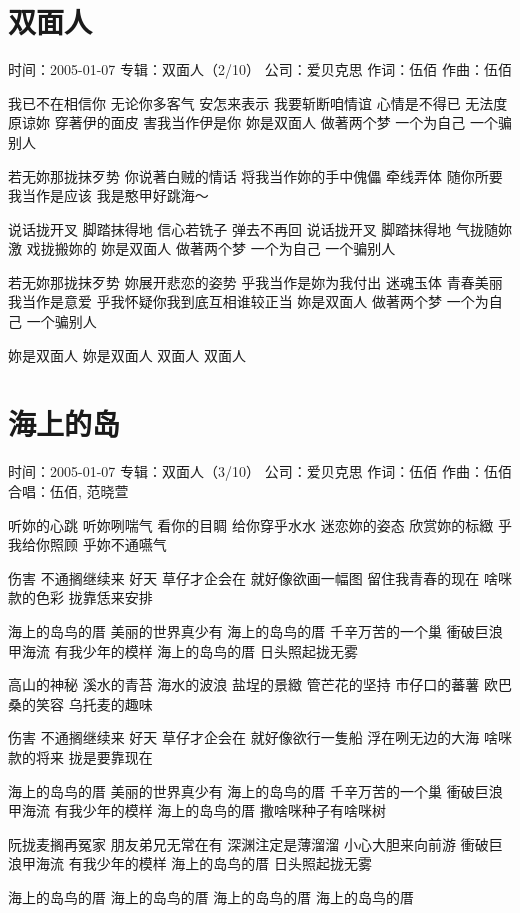 \documentclass[UTF8,a4paper,oneside,twocolumn,12pt]{ctexbook}
\newcommand{\infopair}[2]{\textbullet #1：#2}
\newcommand{\zc}[1][伍佰]{\infopair{作词}{#1}}
\newcommand{\zq}[1][伍佰]{\infopair{作曲}{#1}}
\newcommand{\zj}[1]{\infopair{专辑}{#1}}
\newcommand{\sj}[1]{\infopair{时间}{#1}}
\newcommand{\gs}[1]{\infopair{公司}{#1}}
\newenvironment{info}{\begin{flushleft}\kaishu
	}
	{\end{flushleft}\normalsize\yahei\par}
\newenvironment{lyric}{
	}
{}
\begin{document}
\section{双面人}
\begin{info}
	\sj{2005-01-07}
	\zj{双面人（2/10）}
	\gs{爱贝克思}
	\zc
	\zq
\end{info}
\begin{lyric}
	我已不在相信你 无论你多客气
	安怎来表示 我要斩断咱情谊
	心情是不得已 无法度原谅妳
	穿著伊的面皮 害我当作伊是你
	妳是双面人 做著两个梦
	一个为自己 一个骗别人

	若无妳那拢抹歹势 你说著白贼的情话
	将我当作妳的手中傀儡
	牵线弄体 随你所要 我当作是应该
	我是憨甲好跳海～

	说话拢开叉 脚踏抹得地
	信心若铣子 弹去不再回
	说话拢开叉 脚踏抹得地
	气拢随妳激 戏拢搬妳的
	妳是双面人 做著两个梦
	一个为自己 一个骗别人

	若无妳那拢抹歹势 妳展开悲恋的姿势
	乎我当作是妳为我付出
	迷魂玉体 青春美丽 我当作是意爱
	乎我怀疑你我到底互相谁较正当
	妳是双面人 做著两个梦
	一个为自己 一个骗别人

	妳是双面人 妳是双面人 双面人 双面人
\end{lyric}

\section{海上的岛}
\begin{info}
	\sj{2005-01-07}
	\zj{双面人（3/10）}
	\gs{爱贝克思}
	\zc
	\zq
	\infopair{合唱}{伍佰, 范晓萱}
\end{info}
\begin{lyric}
	听妳的心跳 听妳咧喘气
	看你的目睭 给你穿乎水水
	迷恋妳的姿态 欣赏妳的标緻
	乎我给你照顾 乎妳不通嚥气

	伤害 不通搁继续来
	好天 草仔才企会在
	就好像欲画一幅图 留住我青春的现在
	啥咪款的色彩 拢靠恁来安排

	海上的岛鸟的厝 美丽的世界真少有
	海上的岛鸟的厝 千辛万苦的一个巢
	衝破巨浪甲海流 有我少年的模样
	海上的岛鸟的厝 日头照起拢无雾

	高山的神秘 溪水的青苔
	海水的波浪 盐埕的景緻
	管芒花的坚持 市仔口的蕃薯
	欧巴桑的笑容 乌托麦的趣味

	伤害 不通搁继续来
	好天 草仔才企会在
	就好像欲行一隻船 浮在咧无边的大海
	啥咪款的将来 拢是要靠现在

	海上的岛鸟的厝 美丽的世界真少有
	海上的岛鸟的厝 千辛万苦的一个巢
	衝破巨浪甲海流 有我少年的模样
	海上的岛鸟的厝 撒啥咪种子有啥咪树

	阮拢麦搁再冤家 朋友弟兄无常在有
	深渊注定是薄溜溜 小心大胆来向前游
	衝破巨浪甲海流 有我少年的模样
	海上的岛鸟的厝 日头照起拢无雾

	海上的岛鸟的厝 海上的岛鸟的厝
	海上的岛鸟的厝 海上的岛鸟的厝
\end{lyric}
\end{document}
